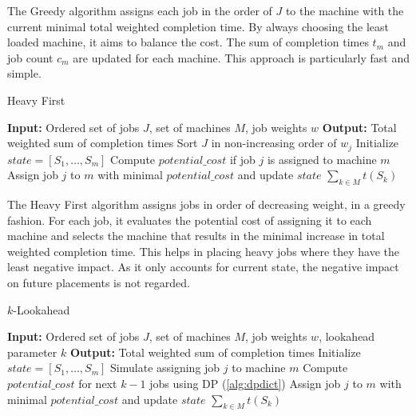The Greedy algorithm assigns each job in the order of $J$ to the machine with the current minimal total weighted completion time. By always choosing the least loaded machine, it aims to balance the cost. The sum of completion times $t_m$ and job count $c_m$ are updated for each machine. This approach is particularly fast and simple.

\begin{algorithm}[H]
    \caption{Heavy First}\label{alg:heavyfirst}
    \begin{algorithmic}[1]
        \State \textbf{Input:} Ordered set of jobs $J$, set of machines $M$, job weights $w$
        \State \textbf{Output:} Total weighted sum of completion times
        \State Sort $J$ in non-increasing order of $w_j$
        \State Initialize $state = [S_1, \dots, S_m]$
                \State Compute $potential\_cost$ if job $j$ is assigned to machine $m$
            \EndFor
            \State Assign job $j$ to $m$ with minimal $potential\_cost$ and update $state$
        \EndFor
        \State \Return $\sum_{k \in M} t(S_k)$
    \end{algorithmic}
\end{algorithm}

The Heavy First algorithm assigns jobs in order of decreasing weight, in a greedy fashion. For each job, it evaluates the potential cost of assigning it to each machine and selects the machine that results in the minimal increase in total weighted completion time. This helps in placing heavy jobs where they have the least negative impact. As it only accounts for current state, the negative impact on future placements is not regarded.

\begin{algorithm}[H]
    \caption{$k$-Lookahead}\label{alg:klookahead}
    \begin{algorithmic}[1]
        \State \textbf{Input:} Ordered set of jobs $J$, set of machines $M$, job weights $w$, lookahead parameter $k$
        \State \textbf{Output:} Total weighted sum of completion times
        \State Initialize $state = [S_1, \dots, S_m]$
                \State Simulate assigning job $j$ to machine $m$
                \State Compute $potential\_cost$ for next $k-1$ jobs using DP (\ref{alg:dpdict})
            \EndFor
            \State Assign job $j$ to $m$ with minimal $potential\_cost$ and update $state$
        \EndFor
        \State \Return $\sum_{k \in M} t(S_k)$
    \end{algorithmic}
\end{algorithm}


